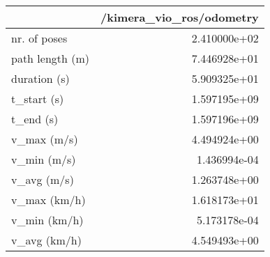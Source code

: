 \begin{tabular}{lr}
\toprule
{} &  /kimera\_vio\_ros/odometry \\
\midrule
nr. of poses    &              2.410000e+02 \\
path length (m) &              7.446928e+01 \\
duration (s)    &              5.909325e+01 \\
t\_start (s)     &              1.597195e+09 \\
t\_end (s)       &              1.597196e+09 \\
v\_max (m/s)     &              4.494924e+00 \\
v\_min (m/s)     &              1.436994e-04 \\
v\_avg (m/s)     &              1.263748e+00 \\
v\_max (km/h)    &              1.618173e+01 \\
v\_min (km/h)    &              5.173178e-04 \\
v\_avg (km/h)    &              4.549493e+00 \\
\bottomrule
\end{tabular}

